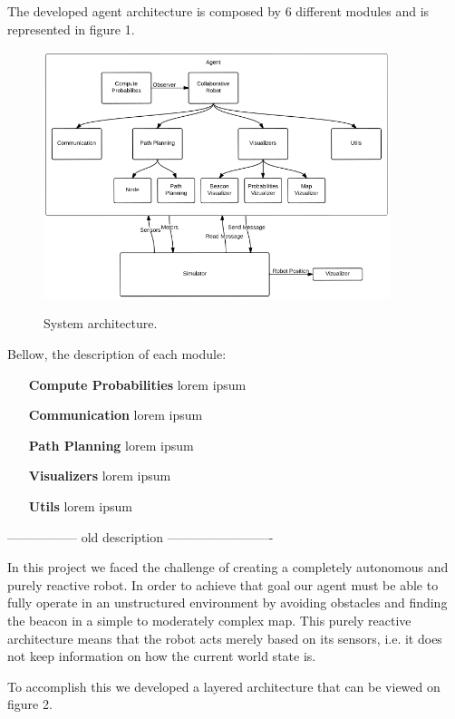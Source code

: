 \documentclass[oribibl]{llncs}
\begin{document}
The developed agent architecture is composed by 6 different modules and is represented in figure 1.

\begin{figure}
  \centering
  \includegraphics[width=0.9\textwidth]{robot-architecture.png}
  \label{fig:layered}
  \caption{System architecture.}
\end{figure}

Bellow, the description of each module:

\begin{itemize}
  \item[\textbf{Compute Probabilities}]
  lorem ipsum
  \item[\textbf{Communication}]
  lorem ipsum
  \item[\textbf{Path Planning}]
  lorem ipsum
  \item[\textbf{Visualizers}]
  lorem ipsum
  \item[\textbf{Utils}]
  lorem ipsum
\end{itemize}

----------------- old description -------------------------

In this project we faced the challenge of creating a completely autonomous and purely reactive robot. In order to achieve that goal our agent must be able to fully operate in an unstructured environment by avoiding obstacles and finding the beacon in a simple to moderately complex map.
This purely reactive architecture means that the robot acts merely based on its sensors, i.e. it does not keep information on how the current world state is.

To accomplish this we developed a layered architecture that can be viewed on figure 2.
\end{document}

